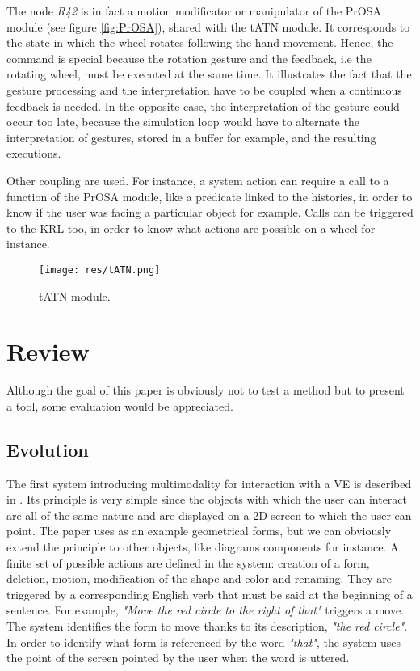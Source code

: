 \documentclass[a4paper]{article}
\begin{document}
The node \textit{R42} is in fact a motion modificator or manipulator of the PrOSA module (see figure \ref{fig:PrOSA}), shared with the tATN module. It corresponds to the state in which the wheel rotates following the hand movement. Hence, the command is special because the rotation gesture and the feedback, i.e the rotating wheel, must be executed at the same time. It illustrates the fact that the gesture processing and the interpretation have to be coupled when a continuous feedback is needed. In the opposite case, the interpretation of the gesture could occur too late, because the simulation loop would have to alternate the interpretation of gestures, stored in a buffer for example, and the resulting executions.

Other coupling are used. For instance, a system action can require a call to a function of the PrOSA module, like a predicate linked to the histories, in order to know if the user was facing a particular object for example. Calls can be triggered to the KRL too, in order to know what actions are possible on a wheel for instance.

\begin{figure}
\centering
\texttt{[image: res/tATN.png]}
\caption{\label{fig:tATN}tATN module.}
\end{figure}

\section{Review}

Although the goal of this paper is obviously not to test a method but to present a tool, some evaluation would be appreciated.

\subsection{Evolution}

The first system introducing multimodality for interaction with a VE is described in \cite{putthatthere}. Its principle is very simple since the objects with which the user can interact are all of the same nature and are displayed on a 2D screen to which the user can point. The paper uses as an example geometrical forms, but we can obviously extend the principle to other objects, like diagrams components for instance. A finite set of possible actions are defined in the system: creation of a form, deletion, motion, modification of the shape and color and renaming. They are triggered by a corresponding English verb that must be said at the beginning of a sentence. For example, \textit{"Move the red circle to the right of that"} triggers a move. The system identifies the form to move thanks to its description, \textit{"the red circle"}. In order to identify what form is referenced by the word \textit{"that"}, the system uses the point of the screen pointed by the user when the word is uttered.
\end{document}
